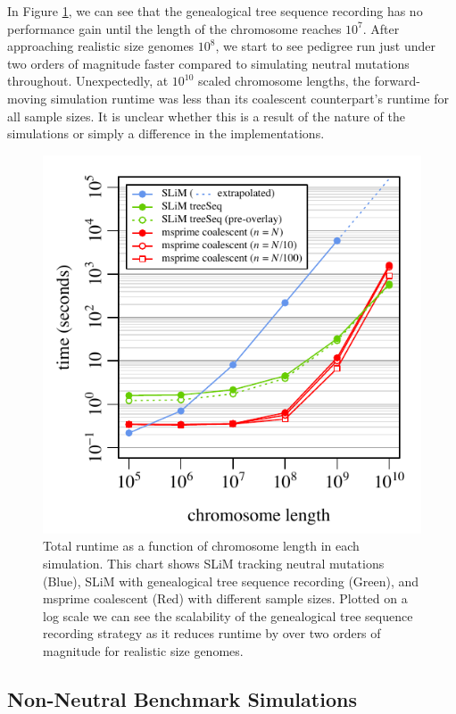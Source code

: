 \documentclass{article}
\begin{document}
In Figure \ref{fig:NeutralComp}, we can see that the genealogical tree sequence recording has no performance gain until the length
of the chromosome reaches $10^{7}$. After approaching realistic size genomes $10^{8}$, 
we start to see pedigree run just under two orders of magnitude faster compared to simulating neutral mutations throughout. 
Unexpectedly, at $10^{10}$ scaled chromosome lengths,
the forward-moving simulation runtime was less than its coalescent counterpart's runtime for all sample sizes.
It is unclear whether this is a result of the nature of the simulations 
or simply a difference in the implementations. 


\begin{figure}[h!tb]
	\begin{center}
  		\includegraphics[width=0.7\linewidth]{../figures/comparison.pdf}
  		\caption{
		Total runtime as a function of chromosome length in each simulation. 
		This chart shows SLiM tracking neutral mutations (Blue),
		SLiM with genealogical tree sequence recording (Green), and msprime coalescent (Red)
		with different sample sizes. 
		Plotted on a log scale we can see the scalability 
		of the genealogical tree sequence recording strategy as it reduces runtime 
		by over two orders of magnitude for realistic size genomes.
		}
  		\label{fig:NeutralComp}
	\end{center}
\end{figure}




\subsection{Non-Neutral Benchmark Simulations}
\end{document}
